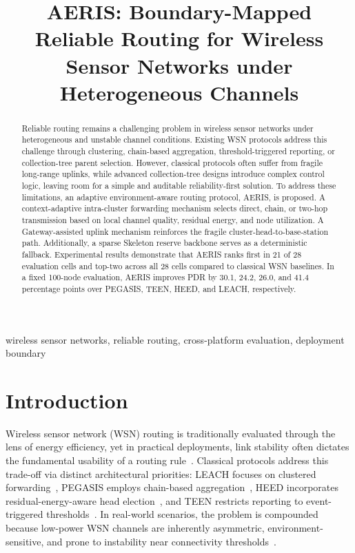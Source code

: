 \documentclass[conference]{IEEEtran}
\title{AERIS: Boundary-Mapped Reliable Routing for Wireless Sensor Networks under Heterogeneous Channels}
\author{
\IEEEauthorblockN{Anonymous Author(s)}
\IEEEauthorblockA{Submission for IEEE LCN 2026 (double-blind review)}
}
\begin{document}
\maketitle

\begin{abstract}
Reliable routing remains a challenging problem in wireless sensor networks under heterogeneous and unstable channel conditions. Existing WSN protocols address this challenge through clustering, chain-based aggregation, threshold-triggered reporting, or collection-tree parent selection. However, classical protocols often suffer from fragile long-range uplinks, while advanced collection-tree designs introduce complex control logic, leaving room for a simple and auditable reliability-first solution. To address these limitations, an adaptive environment-aware routing protocol, AERIS, is proposed. A context-adaptive intra-cluster forwarding mechanism selects direct, chain, or two-hop transmission based on local channel quality, residual energy, and node utilization. A Gateway-assisted uplink mechanism reinforces the fragile cluster-head-to-base-station path. Additionally, a sparse Skeleton reserve backbone serves as a deterministic fallback. Experimental results demonstrate that AERIS ranks first in 21 of 28 evaluation cells and top-two across all 28 cells compared to classical WSN baselines. In a fixed 100-node evaluation, AERIS improves PDR by 30.1, 24.2, 26.0, and 41.4 percentage points over PEGASIS, TEEN, HEED, and LEACH, respectively.
\end{abstract}

\begin{IEEEkeywords}
wireless sensor networks, reliable routing, cross-platform evaluation, deployment boundary
\end{IEEEkeywords}

\section{Introduction}
Wireless sensor network (WSN) routing is traditionally evaluated through the lens of energy efficiency, yet in practical deployments, link stability often dictates the fundamental usability of a routing rule~\cite{akyildiz2002survey,rault2014energy,kandris2009power}. Classical protocols address this trade-off via distinct architectural priorities: LEACH focuses on clustered forwarding~\cite{heinzelman2000energy}, PEGASIS employs chain-based aggregation~\cite{lindsey2002pegasis}, HEED incorporates residual-energy-aware head election~\cite{younis2004heed}, and TEEN restricts reporting to event-triggered thresholds~\cite{manjeshwar2001teen}. In real-world scenarios, the problem is compounded because low-power WSN channels are inherently asymmetric, environment-sensitive, and prone to instability near connectivity thresholds~\cite{zuniga2004analyzing,zamalloa2007analysis,baccour2012radio}.
\end{document}

